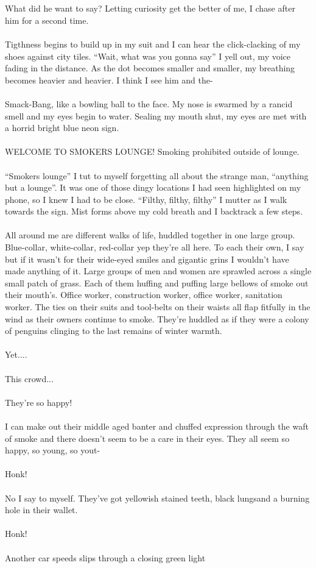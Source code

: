 \documentclass{book}
\begin{document}
{{\\\\What did he want to say?
Letting curiosity get the better of me, I chase after him for a second time.\\\\Tigthness begins to build up in my suit and I can hear the click-clacking of my shoes against city tiles. ``Wait, what was you gonna say'' I yell out, my voice fading in the distance. As the dot becomes smaller and smaller, my breathing becomes heavier and heavier. I think I see him and the-\\\\Smack-Bang, like a bowling ball to the face. My nose is swarmed by a rancid smell and my eyes begin to water. Sealing my mouth shut, my eyes are met with a horrid bright blue neon sign.\\\\WELCOME TO SMOKERS LOUNGE! Smoking prohibited outside of lounge.\\\\``Smokers lounge'' I tut to myself forgetting all about the strange man, ``anything but a lounge''. It was one of those dingy locations I had seen highlighted on my phone, so I knew I had to be close. ``Filthy, filthy, filthy'' I mutter as I walk towards the sign. Mist forms above my cold breath and I backtrack a few steps.\\\\All around me are different walks of life, huddled together in one large group. Blue-collar, white-collar, red-collar yep they're all here. To each their own, I say but if it wasn't for their wide-eyed smiles and gigantic grins I wouldn't have made anything of it. Large groups of men and women are sprawled across a single small patch of grass. Each of them huffing and puffing large bellows of smoke out their mouth's. Office worker, construction worker, office worker, sanitation worker. The ties on their suits and tool-belts on their waists all flap fitfully in the wind as their owners continue to smoke. They're huddled as if they were a colony of penguins clinging to the last remains of winter warmth.\\\\Yet....\\\\This crowd...\\\\ They're so happy!\\\\I can make out their middle aged banter and chuffed expression through the waft of smoke and there doesn't seem to be a care in their eyes. They all seem so happy, so young, so yout-\\\\Honk!\\\\No I say to myself. They've got yellowish stained teeth, black lungsand a burning hole in their wallet.\\\\Honk!\\\\ Another car speeds slips through a closing green light }}
\end{document}
